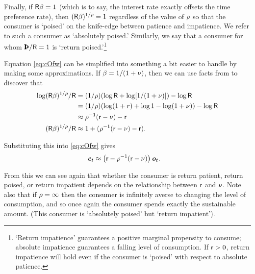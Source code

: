 \documentclass{scrartcl}
\begin{document}
Finally, if $\mathsf{R}\beta=1$ (which is to say, the interest rate
exactly offsets the time preference rate), then $(\mathsf{R}\beta)^{1/\rho}=1$ regardless of the value of
$\rho$ so that the consumer is `poised' on the knife-edge between
patience and impatience.
We refer to
such a consumer as `absolutely poised.'
Similarly, we say that a consumer for
whom $\RPFac=1$ is `return poised.'\footnote{`Return impatience' guarantees a positive marginal propensity to consume; absolute
impatience guarantees a falling level of consumption.
If $\mathsf{r} > 0$, return impatience
will hold even if the consumer is `poised' with respect to absolute patience.}




Equation \eqref{eq:cOfw} can be simplified into something a bit 
easier to handle by making some approximations.
If $\beta = 
1/(1+\nu)$, then we can use facts from  to discover that
\begin{equation*}\begin{gathered}\begin{aligned}
      \log (\mathsf{R}\beta)^{1/\rho}/\mathsf{R} & =  (1/\rho) (\log \mathsf{R} + \log [1/(1+\nu) ]) - \log \mathsf{R}  \\
     & =  (1/\rho) (\log(1+r) + \log 1 - \log (1+\nu) ) - \log \mathsf{R}  \\
         & \approx  \rho^{-1}(\mathsf{r} -\nu)  - \mathsf{r} 
\\      (\mathsf{R}\beta)^{1/\rho}/\mathsf{R} & \approx  1+(\rho^{-1}(\mathsf{r}-\nu)-\mathsf{r})
.
\end{aligned}\end{gathered}\end{equation*}

Substituting this into \eqref{eq:cOfw} gives
\begin{equation}\begin{gathered}\begin{aligned}
        \boldsymbol{\mathit{c}}_{t} & \approx  \left(\mathsf{r}-\rho^{-1}(\mathsf{r}-\nu)\right)\boldsymbol{\mathit{o}}_{t} \label{eq:capprox}
.
\end{aligned}\end{gathered}\end{equation}

From this we can see again that whether the consumer is return patient, return poised, or return impatient
depends on the relationship between $\mathsf{r}$ and $\nu$.
Note also that 
if $\rho = \infty$ then the consumer is infinitely averse to changing 
the level of consumption, and so once again the consumer spends 
exactly the sustainable amount.
(This consumer is `absolutely poised' but `return impatient').
\end{document}
